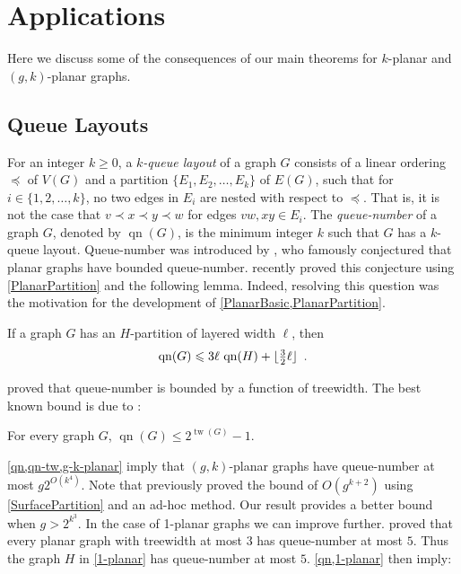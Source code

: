 \documentclass{patmorin}
\DeclareMathOperator{\tw}{tw}
\DeclareMathOperator{\qn}{qn}
\DeclarePairedDelimiter{\floor}{\lfloor}{\rfloor}
\renewcommand{\le}{\leqslant}
\renewcommand{\geq}{\geqslant}
\begin{document}
\section{Applications}
\label{Applications}

Here we discuss some of the consequences of our main theorems for $k$-planar and $(g,k)$-planar graphs. 

\subsection{Queue Layouts}

For an integer $k\geq 0$, a \textit{$k$-queue layout} of a graph $G$ consists of a linear ordering $\preceq$ of $V(G)$ and a partition $\{E_1,E_2,\dots,E_k\}$ of $E(G)$, such that for $i\in\{1,2,\dots,k\}$, no two edges in $E_i$ are nested with respect to $\preceq$. That is, it is not the case that $v\prec x \prec y \prec w$ for edges $vw,xy\in E_i$. The \textit{queue-number} of a graph $G$, denoted by $\qn(G)$, is the minimum integer $k$ such that $G$ has a $k$-queue layout. Queue-number was introduced by \citet{HLR92}, who famously conjectured that planar graphs have bounded queue-number. \citet{dujmovic.joret.ea:planar} recently proved this conjecture using \cref{PlanarPartition} and the following lemma. Indeed, resolving this question was the motivation for the development of \cref{PlanarBasic,PlanarPartition}.

\begin{lem}
\label{qn}
If a graph $G$ has an $H$-partition of layered width $\ell$, then 
\[ \qn(G)\le 3 \ell \, \qn(H) + \floor{\tfrac{3}{2}\ell}\enspace.\]
\end{lem}

\citet{dujmovic.morin.ea:layered} proved that queue-number is bounded by a function of treewidth. 
The best known bound is due to \citet{wiechert:on}:

\begin{thm}
\label{qn-tw}
    For every graph $G$, $\qn(G)\le 2^{\tw(G)}-1$.
\end{thm}

\cref{qn,qn-tw,g-k-planar} imply that $(g,k)$-planar graphs have queue-number at most $g 2^{O(k^4)}$. 
Note that \citet{dujmovic.joret.ea:planar} previously proved the bound of 
$O(g^{k+2})$ using \cref{SurfacePartition} and an ad-hoc method. Our result provides a better bound when $g>2^{k^3}$. In the case of 1-planar graphs we can improve further. \citet{ABGKP18} proved that every planar graph with treewidth at most $3$ has queue-number at most $5$. Thus the graph $H$ in \cref{1-planar} has queue-number at most $5$. \cref{qn,1-planar} then imply:
\end{document}
